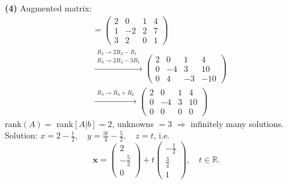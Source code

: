 \noindent\textbf{(4)} Augmented matrix:
\begin{align*}
[A|b] &= \left(\begin{array}{ccc|c}2 & 0 & 1 & 4 \\ 1 & -2 & 2 & 7 \\ 3 & 2 & 0 & 1\end{array}\right) \\
&\xrightarrow{\substack{R_2\to 2R_2-R_1\\ R_3\to 2R_3-3R_1}} \left(\begin{array}{ccc|c}2 & 0 & 1 & 4 \\ 0 & -4 & 3 & 10 \\ 0 & 4 & -3 & -10\end{array}\right) \\
&\xrightarrow{\substack{R_3\to R_3+R_2}} \left(\begin{array}{ccc|c}2 & 0 & 1 & 4 \\ 0 & -4 & 3 & 10 \\ 0 & 0 & 0 & 0\end{array}\right)
\end{align*}
rank$(A)=$ rank$[A|b]=2$, unknowns $=3$ $\Rightarrow$ infinitely many solutions. Solution: $x=2 - \frac{t}{2}, \quad y=\frac{3 t}{4} - \frac{5}{2}, \quad z=t$, i.e. \[ \mathbf{x}=\begin{pmatrix}2 \\ - \frac{5}{2} \\ 0\end{pmatrix} + t\begin{pmatrix}- \frac{1}{2} \\ \frac{3}{4} \\ 1\end{pmatrix}, \quad t\in\mathbb{R}. \]

